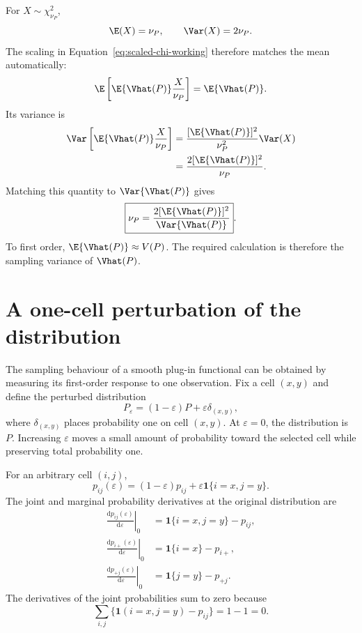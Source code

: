 For \(X\sim\chi^2_{\nu_P}\),
\begin{equation}
  \E(X)=\nu_P,
  \qquad
  \Var(X)=2\nu_P.
\end{equation}
The scaling in Equation~\eqref{eq:scaled-chi-working} therefore matches the
mean automatically:
\begin{equation}
  \E\left[
  \E\{\Vhat(P)\}\frac{X}{\nu_P}
  \right]
  =\E\{\Vhat(P)\}.
\end{equation}
Its variance is
\begin{align}
  \Var\left[
  \E\{\Vhat(P)\}\frac{X}{\nu_P}
  \right]
  &=
  \frac{[\E\{\Vhat(P)\}]^2}{\nu_P^2}
  \Var(X)\\
  &=
  \frac{2[\E\{\Vhat(P)\}]^2}{\nu_P}.
\end{align}
Matching this quantity to \(\Var\{\Vhat(P)\}\) gives
\begin{equation}
  \boxed{
  \nu_P
  =
  \frac{2[\E\{\Vhat(P)\}]^2}
       {\Var\{\Vhat(P)\}}
  }.
  \label{eq:component-df-moments}
\end{equation}
To first order, \(\E\{\Vhat(P)\}\approx V(P)\). The required calculation is
therefore the sampling variance of \(\Vhat(P)\).

\section{A one-cell perturbation of the distribution}

The sampling behaviour of a smooth plug-in functional can be obtained by
measuring its first-order response to one observation. Fix a cell
\((x,y)\) and define the perturbed distribution
\begin{equation}
  P_\varepsilon
  =(1-\varepsilon)P+\varepsilon\delta_{(x,y)},
  \label{eq:contamination-path}
\end{equation}
where \(\delta_{(x,y)}\) places probability one on cell \((x,y)\). At
\(\varepsilon=0\), the distribution is \(P\). Increasing \(\varepsilon\)
moves a small amount of probability toward the selected cell while preserving
total probability one.

For an arbitrary cell \((i,j)\),
\begin{equation}
  p_{ij}(\varepsilon)
  =(1-\varepsilon)p_{ij}
  +\varepsilon\mathbf 1\{i=x,j=y\}.
\end{equation}
The joint and marginal probability derivatives at the original distribution
are
\begin{align}
  \left.\frac{\mathrm d p_{ij}(\varepsilon)}{\mathrm d\varepsilon}
  \right|_{0}
  &=\mathbf 1\{i=x,j=y\}-p_{ij},
  \label{eq:joint-perturbation-derivative}\\
  \left.\frac{\mathrm d p_{i+}(\varepsilon)}{\mathrm d\varepsilon}
  \right|_{0}
  &=\mathbf 1\{i=x\}-p_{i+},\\
  \left.\frac{\mathrm d p_{+j}(\varepsilon)}{\mathrm d\varepsilon}
  \right|_{0}
  &=\mathbf 1\{j=y\}-p_{+j}.
\end{align}
The derivatives of the joint probabilities sum to zero because
\begin{equation}
  \sum_{i,j}
  \{\mathbf 1(i=x,j=y)-p_{ij}\}
  =1-1=0.
\end{equation}

